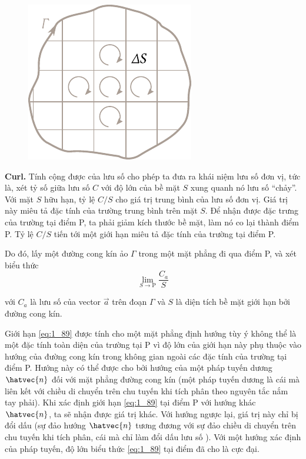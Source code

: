 \begin{figure}[!htb]
	\begin{center}
		\includegraphics[scale=1]{figures/ch_01/fig_1_29.pdf}
		\caption[]{}
		\label{fig:1_29}
	\end{center}
	\vspace{-0.8cm}
\end{figure}

\textbf{Curl.} Tính cộng được của lưu số cho phép ta đưa ra khái niệm lưu số đơn vị, tức là, xét tỷ số giữa lưu số $C$ với độ lớn của bề mặt $S$ xung quanh nó lưu số ``chảy''. Với mặt $S$ hữu hạn, tỷ lệ $C/S$ cho giá trị trung bình của lưu số đơn vị. Giá trị này miêu tả đặc tính của trường trung bình trên mặt $S$. Để nhận được đặc trưng của trường tại điểm P, ta phải giảm kích thước bề mặt, làm nó co lại thành điểm P. Tỷ lệ $C/S$ tiến tới một giới hạn miêu tả đặc tính của trường tại điểm P.

Do đó, lấy một đường cong kín ảo $\Gamma$ trong một mặt phẳng đi qua điểm P, và xét biểu thức
\begin{equation}\label{eq:1_89}
	\lim_{S\to\text{P}} \frac{C_a}{S}
\end{equation}

\noindent
với $C_a$ là lưu số của vector $\vec{a}$ trên đoạn $\Gamma$ và $S$ là diện tích bề mặt giới hạn bởi đường cong kín.

Giới hạn \eqref{eq:1_89} được tính cho một mặt phẳng định hướng tùy ý không thể là một đặc tính toàn diện của trường tại P vì độ lớn của giới hạn này phụ thuộc vào hướng của đường cong kín trong không gian ngoài các đặc tính của trường tại điểm P. Hướng này có thể được cho bởi hướng của một pháp tuyến dương $\hatvec{n}$ đối với mặt phẳng đường cong kín (một pháp tuyến dương là cái mà liên kết với chiều di chuyển trên chu tuyến khi tích phân theo nguyên tắc nắm tay phải). Khi xác định giới hạn \eqref{eq:1_89} tại điểm P với hướng khác $\hatvec{n}$, ta sẽ nhận được giá trị khác. Với hướng ngược lại, giá trị này chỉ bị đổi dấu (sự đảo hướng $\hatvec{n}$ tương đương với sự đảo chiều di chuyển trên chu tuyến khi tích phân, cái mà chỉ làm đổi dấu lưu số ). Với một hướng xác định của pháp tuyến, độ lớn biểu thức \eqref{eq:1_89} tại điểm đã cho là cực đại.

